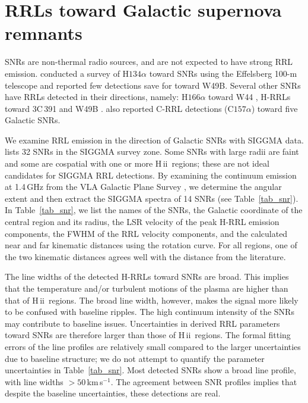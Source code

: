 \documentclass[manuscript]{aastex61}
\newcommand{\hii}{{\rm H\,}{{\sc ii}}}
\newcommand{\kms}{\,km\,s$^{-1}$}
\begin{document}
\section{RRLs toward Galactic supernova remnants} \label{sec_snr}

SNRs are non-thermal radio sources, and are not expected to have strong RRL emission.
\citet{Downes1974} conducted a survey of H$134\alpha$ toward SNRs using the Effelsberg 100-m telescope and reported few detections save for toward W49B.
Several other SNRs have RRLs detected in their directions, namely: H$166\alpha$ toward W44 \citep{Bignell1973}, H-RRLs toward 3C\,391 and W49B \citep{Cesarsky1973a,Pankonin1975}.
\citet{Cesarsky1976} also reported C-RRL detections (C$157\alpha$) toward five Galactic SNRs.

We examine RRL emission in the direction of Galactic SNRs with SIGGMA data.
\citep[][, hereafter the ``Green catalog'']{Green2014} lists 32 SNRs in the SIGGMA survey zone.
Some SNRs with large radii are faint and some are cospatial with one or more \hii\ regions; these are not ideal candidates for SIGGMA RRL detections.
By examining the continuum emission at 1.4\,GHz from the VLA Galactic Plane Survey \citep[VGPS,][]{Stil2006}, we determine the angular extent and then extract the SIGGMA spectra of 14 SNRs (see Table~\ref{tab_snr}).
In Table~\ref{tab_snr}, we list the names of the SNRs, the Galactic coordinate of the central region and its radius, the LSR velocity of the peak H-RRL emission components, the FWHM of the RRL velocity components, and the calculated near and far kinematic distances using the \citet{Reid2014} rotation curve.
For all regions, one of the two kinematic distances agrees well with the distance from the literature.

The line widths of the detected H-RRLs toward SNRs are broad. 
This implies that the temperature and/or turbulent motions of the plasma are higher than that of \hii\ regions.
The broad line width, however, makes the signal  more likely to be confused with baseline ripples.
The high continuum intensity of the SNRs may contribute to baseline issues. 
Uncertainties in derived RRL parameters toward SNRs are therefore larger than those of \hii\ regions.
The formal fitting errors of the line profiles are relatively small compared to the larger uncertainties due to baseline structure; we do not attempt to quantify the parameter uncertainties in Table~\ref{tab_snr}.
Most detected SNRs show a broad line profile, with line widths $>50$\kms.
The agreement between SNR profiles implies that despite the baseline uncertainties, these detections are real.
\end{document}
